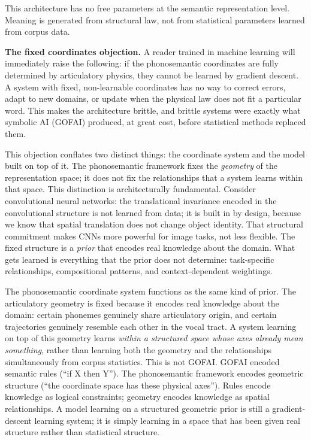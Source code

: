 \documentclass[12pt]{article}
\begin{document}
This architecture has no free parameters at the semantic representation level. Meaning is generated from structural law, not from statistical parameters learned from corpus data.

\textbf{The fixed coordinates objection.} A reader trained in machine learning will immediately raise the following: if the phonosemantic coordinates are fully determined by articulatory physics, they cannot be learned by gradient descent. A system with fixed, non-learnable coordinates has no way to correct errors, adapt to new domains, or update when the physical law does not fit a particular word. This makes the architecture brittle, and brittle systems were exactly what symbolic AI (GOFAI) produced, at great cost, before statistical methods replaced them.

This objection conflates two distinct things: the coordinate system and the model built on top of it. The phonosemantic framework fixes the \textit{geometry} of the representation space; it does not fix the relationships that a system learns within that space. This distinction is architecturally fundamental. Consider convolutional neural networks: the translational invariance encoded in the convolutional structure is not learned from data; it is built in by design, because we know that spatial translation does not change object identity. That structural commitment makes CNNs more powerful for image tasks, not less flexible. The fixed structure is a \textit{prior} that encodes real knowledge about the domain. What gets learned is everything that the prior does not determine: task-specific relationships, compositional patterns, and context-dependent weightings.

The phonosemantic coordinate system functions as the same kind of prior. The articulatory geometry is fixed because it encodes real knowledge about the domain: certain phonemes genuinely share articulatory origin, and certain trajectories genuinely resemble each other in the vocal tract. A system learning on top of this geometry learns \textit{within a structured space whose axes already mean something}, rather than learning both the geometry and the relationships simultaneously from corpus statistics. This is not GOFAI. GOFAI encoded semantic rules (``if X then Y''). The phonosemantic framework encodes geometric structure (``the coordinate space has these physical axes''). Rules encode knowledge as logical constraints; geometry encodes knowledge as spatial relationships. A model learning on a structured geometric prior is still a gradient-descent learning system; it is simply learning in a space that has been given real structure rather than statistical structure.
\end{document}
